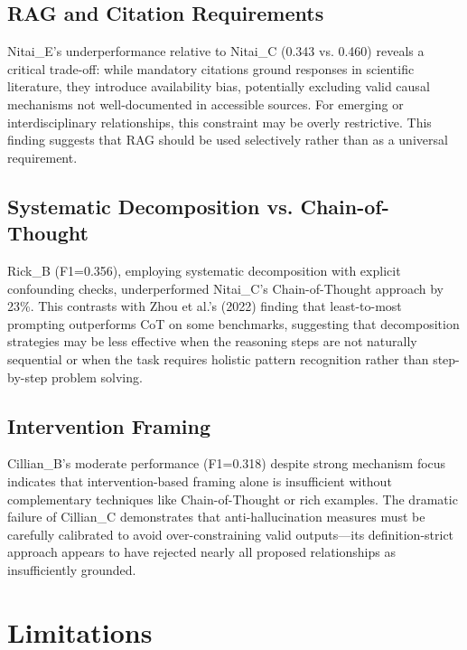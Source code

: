 \subsection{RAG and Citation Requirements}

Nitai\_E's underperformance relative to Nitai\_C (0.343 vs. 0.460) reveals a critical trade-off: while mandatory citations ground responses in scientific literature, they introduce availability bias, potentially excluding valid causal mechanisms not well-documented in accessible sources. For emerging or interdisciplinary relationships, this constraint may be overly restrictive. This finding suggests that RAG should be used selectively rather than as a universal requirement.

\subsection{Systematic Decomposition vs. Chain-of-Thought}

Rick\_B (F1=0.356), employing systematic decomposition with explicit confounding checks, underperformed Nitai\_C's Chain-of-Thought approach by 23\%. This contrasts with Zhou et al.'s (2022) finding that least-to-most prompting outperforms CoT on some benchmarks, suggesting that decomposition strategies may be less effective when the reasoning steps are not naturally sequential or when the task requires holistic pattern recognition rather than step-by-step problem solving.

\subsection{Intervention Framing}

Cillian\_B's moderate performance (F1=0.318) despite strong mechanism focus indicates that intervention-based framing alone is insufficient without complementary techniques like Chain-of-Thought or rich examples. The dramatic failure of Cillian\_C demonstrates that anti-hallucination measures must be carefully calibrated to avoid over-constraining valid outputs—its definition-strict approach appears to have rejected nearly all proposed relationships as insufficiently grounded.

\section{Limitations}

